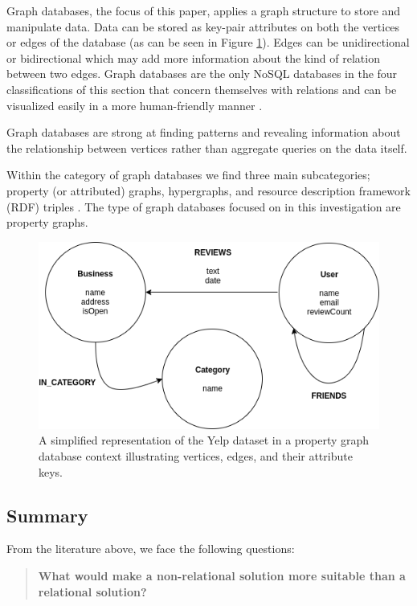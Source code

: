 Graph databases, the focus of this paper, applies a graph structure to store and manipulate data. Data can be stored as key-pair attributes on both the vertices or edges of the database (as can be seen in Figure \ref{fig:graph-db}). Edges can be unidirectional or bidirectional which may add more information about the kind of relation between two edges. Graph databases are the only NoSQL databases in the four classifications of this section that concern themselves with relations and can be visualized easily in a more human-friendly manner \cite{nosql-db}.

Graph databases are strong at finding patterns and revealing information about the relationship between vertices rather than aggregate queries on the data itself.

Within the category of graph databases we find three main subcategories; property (or attributed) graphs, hypergraphs, and resource description framework (RDF) triples \cite{socialdata}. The type of graph databases focused on in this investigation are property graphs.

\begin{figure}[h!]
    \centering
    \includegraphics[width=12cm]{img/graph-db.png}
    \caption{A simplified representation of the Yelp dataset in a property graph database context illustrating vertices, edges, and their attribute keys.}
    \label{fig:graph-db}
\end{figure}

\subsection{Summary}

From the literature above, we face the following questions:

\begin{quote}
    \textbf{What would make a non-relational solution more suitable than a relational solution?}
\end{quote}

